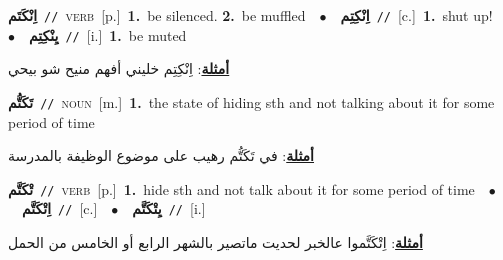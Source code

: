 \documentclass[10pt,a4paper,twoside]{article} %
\begin{document}
\begin{multicols}{2}
{\setlength\topsep{0pt}\textbf{\foreignlanguage{arabic}{اِنْكَتَم}}\ {\color{gray}\texttt{//}\color{black}}\ \textsc{verb}\ [p.]\ \textbf{1.}~be silenced.  \textbf{2.}~be muffled\ \ $\bullet$\ \ \setlength\topsep{0pt}\textbf{\foreignlanguage{arabic}{اِنْكِتِم}}\ {\color{gray}\texttt{//}\color{black}}\ [c.]\ \textbf{1.}~shut up!\ \ $\bullet$\ \ \setlength\topsep{0pt}\textbf{\foreignlanguage{arabic}{يِنْكِتِم}}\ {\color{gray}\texttt{//}\color{black}}\ [i.]\ \textbf{1.}~be muted\  \begin{flushright}\color{gray}\foreignlanguage{arabic}{\textbf{\underline{\foreignlanguage{arabic}{أمثلة}}}: اِنْكِتِم خليني أفهم منيح شو بيحي}\end{flushright}\color{black}} \vspace{2mm}

{\setlength\topsep{0pt}\textbf{\foreignlanguage{arabic}{تَكَتُّم}}\ {\color{gray}\texttt{//}\color{black}}\ \textsc{noun}\ [m.]\ \textbf{1.}~the state of hiding sth and not talking about it for some period of time\  \begin{flushright}\color{gray}\foreignlanguage{arabic}{\textbf{\underline{\foreignlanguage{arabic}{أمثلة}}}: في تَكَتُّم رهيب على موضوع الوظيفة بالمدرسة}\end{flushright}\color{black}} \vspace{2mm}

{\setlength\topsep{0pt}\textbf{\foreignlanguage{arabic}{تْكَتَّم}}\ {\color{gray}\texttt{//}\color{black}}\ \textsc{verb}\ [p.]\ \textbf{1.}~hide sth and not talk about it for some period of time\ \ $\bullet$\ \ \setlength\topsep{0pt}\textbf{\foreignlanguage{arabic}{اِتْكَتَّم}}\ {\color{gray}\texttt{//}\color{black}}\ [c.]\ \ $\bullet$\ \ \setlength\topsep{0pt}\textbf{\foreignlanguage{arabic}{يِتْكَتَّم}}\ {\color{gray}\texttt{//}\color{black}}\ [i.]\  \begin{flushright}\color{gray}\foreignlanguage{arabic}{\textbf{\underline{\foreignlanguage{arabic}{أمثلة}}}: اِتْكَتَّموا عالخبر لحديت ماتصير بالشهر الرابع أو الخامس من الحمل}\end{flushright}\color{black}} \vspace{2mm}


\end{multicols}
\end{document}
